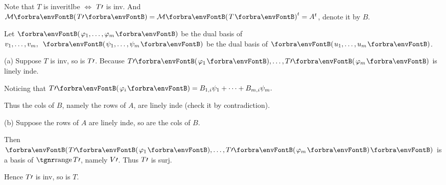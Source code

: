 \documentclass[a4paper, 11pt, UTF8]{article}
\begin{document}
\begin{large}
Note that $T$ is inveritlbe $\Longleftrightarrow$ $T\prime$ is inv. And $\Mt{T\apostrophe}=\Mt{T}^t=A^t$, denote it by $B$.\par\quad
Let $\Par{\varphi_1,\dots,\varphi_m}$ be the dual basis of ${v_1,\dots,v_m},\,\,\,\Par{\psi_1,\dots,\psi_m}$ be the dual basis of $\Par{u_1,\dots,u_m}$.\par\quad
(a) Suppose $T$ is inv, so is $T\prime$. Because $T\apostrophe\Par{\varphi_1},\dots,T\apostrophe\Par{\varphi_m}$ is linely inde.\par\quad\Ha
Noticing that $T\apostrophe\Par{\varphi_i}=B_{1,i}\psi_1+\dots+B_{m,i}\psi_m.$\par\quad\Ha
Thus the cols of $B$, namely the rows of $A$, are linely inde (check it by contradiction).\par\quad
(b) Suppose the rows of $A$ are linely inde, so are the cols of $B$.\par\quad\Hb
Then $\Par{T\apostrophe\Par{\varphi_1},\dots,T\apostrophe\Par{\varphi_m}}$ is a basis of $\range T\apostrophe$, namely $V\prime$. Thus $T\prime$ is surj.\par\quad\Hb
Hence $T\prime$ is inv, so is $T.$\PfEnd
\SepLine


\end{large}
\end{document}
